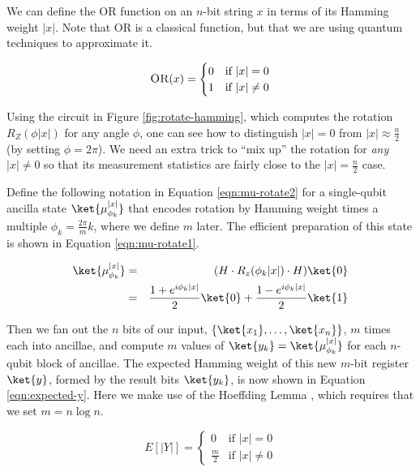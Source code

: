 We can define the \textsc{OR} function on an $n$-bit string $x$ in terms of
its Hamming weight
$|x|$. Note that \textsc{OR} is a classical function, but that we are using quantum
techniques to approximate it.

\begin{equation}
\textsc{OR}(x) =
\begin{cases}
0 & \text{if } |x| = 0\\
1 & \text{if } |x| \ne 0
\end{cases}
\end{equation}

Using the circuit in Figure \ref{fig:rotate-hamming}, which computes the
rotation $R_Z(\phi|x|)$ for any angle $\phi$,
one can see how to distinguish $|x|=0$ from
$|x| \approx \frac{n}{2}$ (by setting $\phi=2\pi$).
We need an extra trick to ``mix up'' the
rotation for \emph{any} $|x| \ne 0$ so that its measurement statistics are fairly
close to the $|x| = \frac{n}{2}$ case.

Define the following notation in Equation \ref{eqn:mu-rotate2}
for a single-qubit ancilla state $\ket{\mu^{|x|}_{\phi_k}}$ that
encodes rotation by Hamming weight times a multiple $\phi_k = \frac{2\pi}{m}k$,
where we define $m$ later.
The efficient
preparation of this state is shown in Equation \ref{eqn:mu-rotate1}.

\begin{eqnarray}
\label{eqn:mu-rotate1}
\ket{\mu^{|x|}_{\phi_k}} & = & (H \cdot R_z(\phi_k|x|) \cdot H) \ket{0} \\
                         & = &
\label{eqn:mu-rotate2}
\frac{1 + e^{i\phi_k|x|}}{2}\ket{0} + \frac{1 - e^{i\phi_k|x|}}{2}\ket{1}
\end{eqnarray}

Then we fan out the $n$ bits of our input, $\{\ket{x_1}, \ldots, \ket{x_n}\}$,
$m$ times each into ancillae, and compute $m$ values of
$\ket{y_k} = \ket{\mu^{|x|}_{\phi_k}}$ for each $n$-qubit block of ancillae.
The expected Hamming weight of this new $m$-bit register $\ket{y}$, formed by
the result bits $\ket{y_k}$, is now shown in Equation \ref{eqn:expected-y}.
Here we make use of the Hoeffding Lemma \cite{Hoeffding1963},
which requires that we set
$m = n \log n$.

\begin{equation}
\label{eqn:expected-y}
E[|Y|] =
\begin{cases}
0 & \text{if } |x| = 0\\
\frac{m}{2} & \text{if } |x| \ne 0
\end{cases}
\end{equation}

